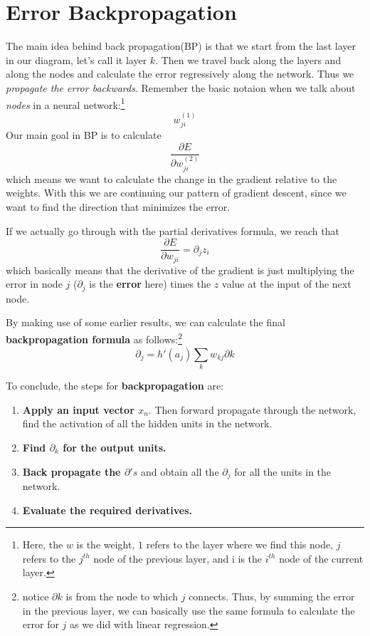 \documentclass{tufte-handout}
\begin{document}
\section{Error Backpropagation}
The main idea behind back propagation(BP) is that we start from the last layer in our diagram, let's 
call it layer $k$. Then we travel back along the layers and along the nodes and calculate the 
error regressively along the network. Thus we \textit{propagate the error backwards}. Remember the 
basic notaion when we talk about \textit{nodes} in a neural network:\footnote{ Here, the $w$ is the 
weight, $1$ refers to the layer where we find this node, $j$ refers to the $j^{th}$ node of the 
previous layer, and i is the $i^{th}$ node of the current layer.}
\[ w^{(1)}_{ji}\]
Our main goal in BP is to calculate 
\[\frac{\partial E}{\partial w^{(2)}_{ji}}\]  
which means we want to calculate the change in the gradient relative to the weights. With this we are 
continuing our pattern of gradient descent, since we want to find the direction that minimizes the error.

If we actually go through with the partial derivatives formula, we reach that
\[ \frac{\partial E}{\partial w_{ji}} = \partial_{j}z_{i}\]
which basically means that the derivative of the gradient is just multiplying the error in node $j$
($\partial_{j}$ is the \textbf{error} here) times the $z$ value at the input of the next node.

By making use of some earlier results, we can calculate the final \textbf{backpropagation formula} as
follows:\footnote{notice $\partial k$ is from the node to which $j$ connects. Thus, by summing the 
error in the previous layer, we can basically use the same formula to calculate the error for $j$
as we did with linear regression.}
\[\partial_{j} = h'(a_{j})\sum_{k}^{}w_{kj}\partial k\]

To conclude, the steps for \textbf{backpropagation} are:
\begin{enumerate}
		\item{\textbf{Apply an input vector $x_{n}$}}. Then forward propagate through the network,
				find the activation of all the hidden units in the network.
		\item{\textbf{Find $\partial_{k}$ for the output units.}}
		\item{\textbf{Back propagate the $\partial 's$}} and obtain all the $\partial_{j}$ for all the 
				units in the network.
		\item{\textbf{Evaluate the required derivatives.}}
\end{enumerate}
\end{document}
